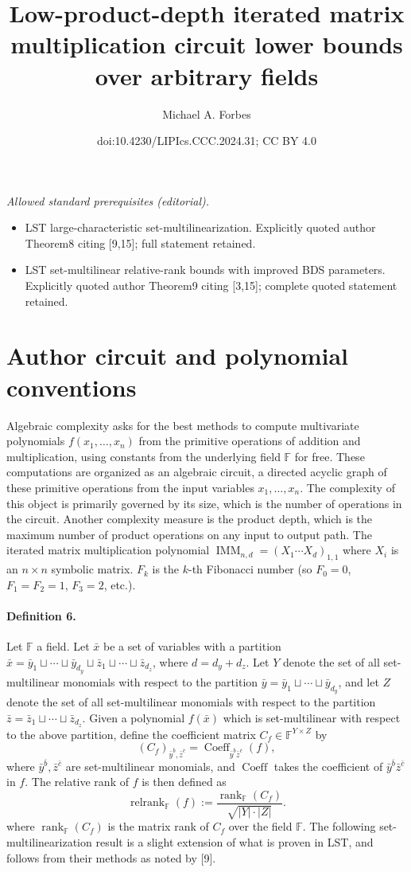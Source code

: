 \documentclass[10pt,a4paper]{article}
\title{Low-product-depth iterated matrix multiplication circuit lower bounds over arbitrary fields}
\author{Michael A. Forbes}
\date{doi:10.4230/LIPIcs.CCC.2024.31; CC BY 4.0}
\begin{document}
\maketitle
\noindent\textit{Allowed standard prerequisites (editorial).}\begin{itemize}
\item LST large-characteristic set-multilinearization. Explicitly quoted author Theorem8 citing [9,15]; full statement retained.
\item LST set-multilinear relative-rank bounds with improved BDS parameters. Explicitly quoted author Theorem9 citing [3,15]; complete quoted statement retained.
\end{itemize}\medskip
\section*{Author circuit and polynomial conventions}
Algebraic complexity asks for the best methods to compute multivariate polynomials $f(x_1,\ldots,x_n)$ from the primitive operations of addition and multiplication, using constants from the underlying field $\mathbb F$ for free. These computations are organized as an algebraic circuit, a directed acyclic graph of these primitive operations from the input variables $x_1,\ldots,x_n$. The complexity of this object is primarily governed by its size, which is the number of operations in the circuit. Another complexity measure is the product depth, which is the maximum number of product operations on any input to output path.
The iterated matrix multiplication polynomial $\operatorname{IMM}_{n,d}=(X_1\cdots X_d)_{1,1}$ where $X_i$ is an $n\times n$ symbolic matrix. $F_k$ is the $k$-th Fibonacci number (so $F_0=0$, $F_1=F_2=1$, $F_3=2$, etc.).
\paragraph{Definition 6.} Let $\mathbb F$ a field. Let $\bar x$ be a set of variables with a partition $\bar x=\bar y_1\sqcup\cdots\sqcup\bar y_{d_y}\sqcup\bar z_1\sqcup\cdots\sqcup\bar z_{d_z}$, where $d=d_y+d_z$. Let $Y$ denote the set of all set-multilinear monomials with respect to the partition $\bar y=\bar y_1\sqcup\cdots\sqcup\bar y_{d_y}$, and let $Z$ denote the set of all set-multilinear monomials with respect to the partition $\bar z=\bar z_1\sqcup\cdots\sqcup\bar z_{d_z}$.
Given a polynomial $f(\bar x)$ which is set-multilinear with respect to the above partition, define the coefficient matrix $C_f\in\mathbb F^{Y\times Z}$ by
\[(C_f)_{\bar y^{\bar b},\bar z^{\bar c}}=\operatorname{Coeff}_{\bar y^{\bar b}\bar z^{\bar c}}(f),\]
where $\bar y^{\bar b},\bar z^{\bar c}$ are set-multilinear monomials, and $\operatorname{Coeff}$ takes the coefficient of $\bar y^{\bar b}\bar z^{\bar c}$ in $f$.
The relative rank of $f$ is then defined as
\[\operatorname{relrank}_{\mathbb F}(f):=\frac{\operatorname{rank}_{\mathbb F}(C_f)}{\sqrt{|Y|\cdot|Z|}}.\]
where $\operatorname{rank}_{\mathbb F}(C_f)$ is the matrix rank of $C_f$ over the field $\mathbb F$.
The following set-multilinearization result is a slight extension of what is proven in LST, and follows from their methods as noted by [9].
\end{document}
